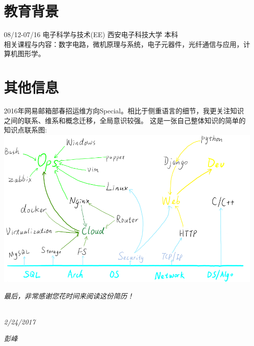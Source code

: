 \documentclass[]{friggeri-cv}
\begin{document}
\section{教育背景}
08/12\hspace{1mm}-\hspace{1mm}07/16 \hspace{27mm} 电子科学与技术(EE) \hspace{7mm}  西安电子科技大学  \hspace{7mm}  本科 \\

相关课程与内容：数字电路，微机原理与系统，电子元器件，光纤通信与应用，计算机图形学。\\


\section{其他信息}
2016年网易邮箱部春招运维方向Special。相比于侧重语言的细节，我更关注知识之间的联系、维系和概念迁移，全局意识较强。
这是一张自己整体知识的简单的知识点联系图:\\
\includegraphics[scale=0.60]{img/devopsgraph.png}

\emph{
最后，非常感谢您花时间来阅读这份简历！\\}
~
\begin{flushleft}
\emph{2/24/2017}
\end{flushleft}
\begin{flushright}
\emph{彭峰}
\end{flushright}
\end{document}
